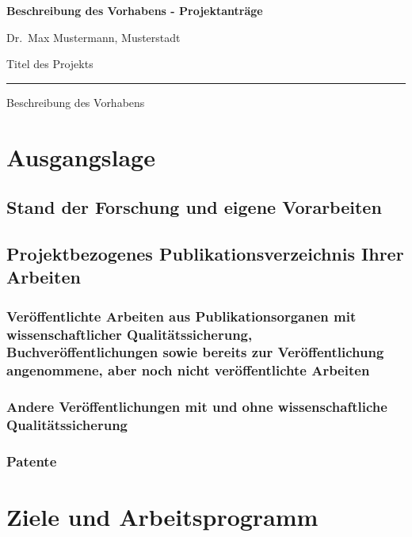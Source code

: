 \documentclass{scrartcl}
\newcommand{\applicants}{Dr.\ Max Mustermann, Musterstadt}
\newcommand{\project}{Titel des Projekts}
\begin{document}
{\raggedright{} \normalsize \bfseries 
	Beschreibung des Vorhabens - Projektanträge \par
    \applicants{} \par
    \project{} \par
	\rule{\textwidth}{0.5pt} \par
	Beschreibung des Vorhabens
}


\section{Ausgangslage}

\subsection{Stand der Forschung und eigene Vorarbeiten}

\subsection{Projektbezogenes Publikationsverzeichnis Ihrer Arbeiten}

\subsubsection{Veröffentlichte Arbeiten aus Publikationsorganen mit wissenschaftlicher Qualitätssicherung, Buchveröffentlichungen sowie bereits zur Veröffentlichung angenommene, aber noch nicht veröffentlichte Arbeiten}
\printbibliography[category=reviewed, heading=none]

\subsubsection{Andere Veröffentlichungen mit und ohne wissenschaftliche Qualitätssicherung}
\printbibliography[category=nonreviewed, heading=none]

\subsubsection{Patente}

\printbibliography[category=patents_pending, heading=none]

\printbibliography[category=patents, heading=none]


\section{Ziele und Arbeitsprogramm}
\end{document}
